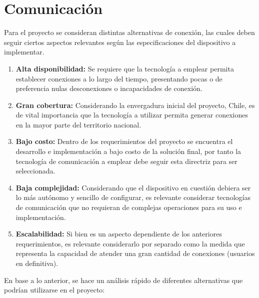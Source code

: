 \section{Comunicación}
Para el proyecto se consideran distintas alternativas de conexión, las cuales deben seguir ciertos aspectos relevantes según las especificaciones del dispositivo a implementar. 


\begin{enumerate}
	\item \textbf{Alta disponibilidad:}
	Se requiere que la tecnología a emplear permita establecer conexiones a lo largo del tiempo, presentando pocas o de preferencia nulas desconexiones o incapacidades de conexión.
	\item \textbf{Gran cobertura:}
	Considerando la envergadura inicial del proyecto, Chile, es de vital importancia que la tecnología a utilizar permita generar conexiones en la mayor parte del territorio nacional.
	\item \textbf{Bajo costo:}
	Dentro de los requerimientos del proyecto se encuentra el desarrollo e implementación a bajo costo de la solución final, por tanto la tecnología de comunicación a emplear debe seguir esta directriz para ser seleccionada.
	\item \textbf{Baja complejidad:}
	Considerando que el dispositivo en cuestión debiera ser lo más autónomo y sencillo de configurar, es relevante considerar tecnologías de comunicación que no requieran de complejas operaciones para su uso e implementación.
	\item \textbf{Escalabilidad:}
	Si bien es un aspecto dependiente de los anteriores requerimientos, es relevante considerarlo por separado como la medida que representa la capacidad de atender una gran cantidad de conexiones (usuarios en definitiva). 
\end{enumerate}

En base a lo anterior, se hace un análisis rápido de diferentes alternativas que podrían utilizarse en el proyecto:

